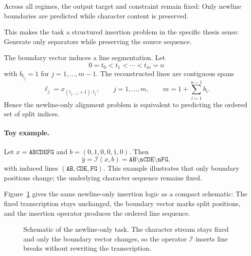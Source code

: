 Across all regimes, the output target and constraint remain fixed: Only newline boundaries are predicted while character content is preserved.

This makes the task a structured insertion problem in the specific thesis sense: Generate only separators while preserving the source sequence.

The boundary vector induces a line segmentation. Let
\[
0=t_0<t_1<\cdots<t_m=n
\]
with $b_{t_j}=1$ for $j=1,\dots,m-1$. The reconstructed lines are contiguous spans
\begin{equation}
\ell_j = x_{(t_{j-1}+1):t_j},\qquad j=1,\dots,m,\qquad
m=1+\sum_{i=1}^{n-1} b_i.
\label{eq:induced_lines}
\end{equation}
Hence the newline-only alignment problem is equivalent to predicting the ordered set of split indices.

\paragraph{Toy example.}
Let $x=\texttt{ABCDEFG}$ and $b=(0,1,0,0,1,0)$. Then
\[
\hat{y}=\mathcal{I}(x,b)=\texttt{AB\textbackslash nCDE\textbackslash nFG},
\]
with induced lines $(\texttt{AB},\texttt{CDE},\texttt{FG})$. This example illustrates that only boundary positions change; the underlying character sequence remains fixed.

Figure~\ref{fig:theory_newline_only_schematic} gives the same newline-only insertion logic as a compact schematic: The fixed transcription stays unchanged, the boundary vector marks split positions, and the insertion operator produces the ordered line sequence.

\begin{figure}[H]
  \centering
  \caption{Schematic of the newline-only task. The character stream stays fixed and only the boundary vector changes, so the operator \(\mathcal{I}\) inserts line breaks without rewriting the transcription.}
  \label{fig:theory_newline_only_schematic}
\end{figure}


